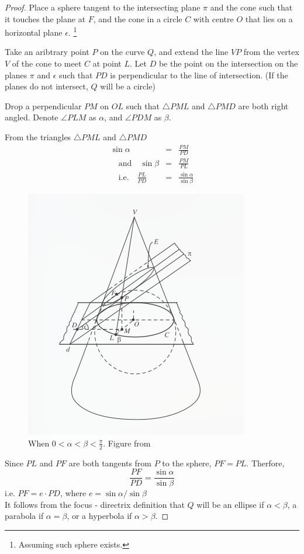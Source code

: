 \begin{proof}
  Place a sphere tangent to the intersecting plane $\pi$ and the cone such that it touches the
  plane at $F$, and the cone in a circle $C$ with centre $O$ that lies on a horizontal plane
  $\epsilon$. \footnote{Assuming such sphere exists.}

  Take an aribtrary point $P$ on the curve $Q$, and extend the line $VP$ from the vertex $V$
  of the cone to meet $C$ at point $L$. Let $D$ be the point on the intersection on the planes
  $\pi$ and $\epsilon$ such that $PD$ is perpendicular to the line of intersection. (If the
  planes do not intersect, $Q$ will be a circle)

  Drop a perpendicular $PM$ on $OL$ such that $\triangle PML$ and $\triangle PMD$ are both
  right angled. Denote $\angle PLM$ as $\alpha$, and $\angle PDM$ as $\beta$.

  From the triangles  $\triangle PML$ and $\triangle PMD$
  \begin{eqnarray*}
    \sin{\alpha}&=&\frac{PM}{PD}\\ 
    \quad \textrm{and} \quad \sin{\beta}&=&\frac{PM}{PL}\\
    \quad \textrm{i.e.} \quad \frac{PL}{PD}&=&\frac{\sin{\alpha}}{\sin{\beta}}
  \end{eqnarray*}

  \begin{figure}[H]
    \center
    \includegraphics[width=0.85\linewidth]{dandelin.png}
    \caption{When $0<\alpha<\beta<\frac{\pi}{2}$. Figure from \cite{brannan}}
  \end{figure}

  Since $PL$ and $PF$ are both tangents from $P$ to the sphere, $PF=PL$. Therfore,
  \[\frac{PF}{PD}=\frac{\sin{\alpha}}{\sin{\beta}}\]
  i.e. $PF=e\cdot PD$, where $e=\sin{\alpha}/\sin{\beta}$\\
  It follows from the focus - directrix definition that $Q$ will be an ellipse if
  $\alpha<\beta$, a parabola if $\alpha=\beta$, or a hyperbola if $\alpha>\beta$.
\end{proof}


